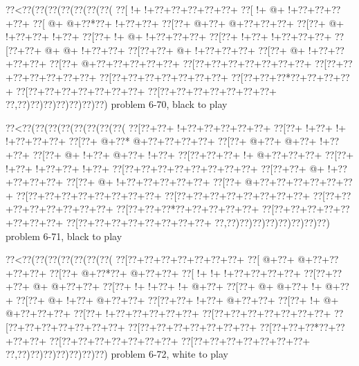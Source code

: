 \vbox{\vbox{\goo
\0??<\0??(\0??(\0??(\0??(\0??(\0??(\0??(
\0??[\- !+\- !+\0??+\0??+\0??+\0??+\0??+
\0??[\- !+\- @+\- !+\0??+\0??+\0??+\0??+
\0??[\- @+\- @+\0??*\0??+\- !+\0??+\0??+
\0??[\0??+\- @+\0??+\- @+\0??+\0??+\0??+
\0??[\0??+\- @+\- !+\0??+\0??+\- !+\0??+
\0??[\0??+\- !+\- @+\- !+\0??+\0??+\0??+
\0??[\0??+\- !+\0??+\- !+\0??+\0??+\0??+
\0??[\0??+\0??+\- @+\- @+\- !+\0??+\0??+
\0??[\0??+\0??+\- @+\- !+\0??+\0??+\0??+
\0??[\0??+\- @+\- !+\0??+\0??+\0??+\0??+
\0??[\0??+\- @+\0??+\0??+\0??+\0??+\0??+
\0??[\0??+\0??+\0??+\0??+\0??+\0??+\0??+
\0??[\0??+\0??+\0??+\0??+\0??+\0??+\0??+
\0??[\0??+\0??+\0??+\0??+\0??+\0??+\0??+
\0??[\0??+\0??+\0??*\0??+\0??+\0??+\0??+
\0??[\0??+\0??+\0??+\0??+\0??+\0??+\0??+
\0??[\0??+\0??+\0??+\0??+\0??+\0??+\0??+
\0??,\0??)\0??)\0??)\0??)\0??)\0??)\0??)
}
\hfil problem 6-70, black to play\hfil\break
}

\vbox{\vbox{\goo
\0??<\0??(\0??(\0??(\0??(\0??(\0??(\0??(\0??(
\0??[\0??+\0??+\- !+\0??+\0??+\0??+\0??+\0??+
\0??[\0??+\- !+\0??+\- !+\- !+\0??+\0??+\0??+
\0??[\0??+\- @+\0??*\- @+\0??+\0??+\0??+\0??+
\0??[\0??+\- @+\0??+\- @+\0??+\- !+\0??+\0??+
\0??[\0??+\- @+\- !+\0??+\- @+\0??+\- !+\0??+
\0??[\0??+\0??+\0??+\- !+\- @+\0??+\0??+\0??+
\0??[\0??+\- !+\0??+\- !+\0??+\0??+\- !+\0??+
\0??[\0??+\0??+\0??+\0??+\0??+\0??+\0??+\0??+
\0??[\0??+\0??+\- @+\- !+\0??+\0??+\0??+\0??+
\0??[\0??+\- @+\- !+\0??+\0??+\0??+\0??+\0??+
\0??[\0??+\- @+\0??+\0??+\0??+\0??+\0??+\0??+
\0??[\0??+\0??+\0??+\0??+\0??+\0??+\0??+\0??+
\0??[\0??+\0??+\0??+\0??+\0??+\0??+\0??+\0??+
\0??[\0??+\0??+\0??+\0??+\0??+\0??+\0??+\0??+
\0??[\0??+\0??+\0??*\0??+\0??+\0??+\0??+\0??+
\0??[\0??+\0??+\0??+\0??+\0??+\0??+\0??+\0??+
\0??[\0??+\0??+\0??+\0??+\0??+\0??+\0??+\0??+
\0??,\0??)\0??)\0??)\0??)\0??)\0??)\0??)\0??)
}
\hfil problem 6-71, black to play\hfil\break
}

\vbox{\vbox{\goo
\0??<\0??(\0??(\0??(\0??(\0??(\0??(\0??(
\0??[\0??+\0??+\0??+\0??+\0??+\0??+\0??+
\0??[\- @+\0??+\- @+\0??+\0??+\0??+\0??+
\0??[\0??+\- @+\0??*\0??+\- @+\0??+\0??+
\0??[\- !+\- !+\- !+\0??+\0??+\0??+\0??+
\0??[\0??+\0??+\0??+\- @+\- @+\0??+\0??+
\0??[\0??+\- !+\- !+\0??+\- !+\- @+\0??+
\0??[\0??+\- @+\- @+\0??+\- !+\- @+\0??+
\0??[\0??+\- @+\- !+\0??+\- @+\0??+\0??+
\0??[\0??+\0??+\- !+\0??+\- @+\0??+\0??+
\0??[\0??+\- !+\- @+\- @+\0??+\0??+\0??+
\0??[\0??+\- !+\0??+\0??+\0??+\0??+\0??+
\0??[\0??+\0??+\0??+\0??+\0??+\0??+\0??+
\0??[\0??+\0??+\0??+\0??+\0??+\0??+\0??+
\0??[\0??+\0??+\0??+\0??+\0??+\0??+\0??+
\0??[\0??+\0??+\0??*\0??+\0??+\0??+\0??+
\0??[\0??+\0??+\0??+\0??+\0??+\0??+\0??+
\0??[\0??+\0??+\0??+\0??+\0??+\0??+\0??+
\0??,\0??)\0??)\0??)\0??)\0??)\0??)\0??)
}
\hfil problem 6-72, white to play\hfil\break
}

